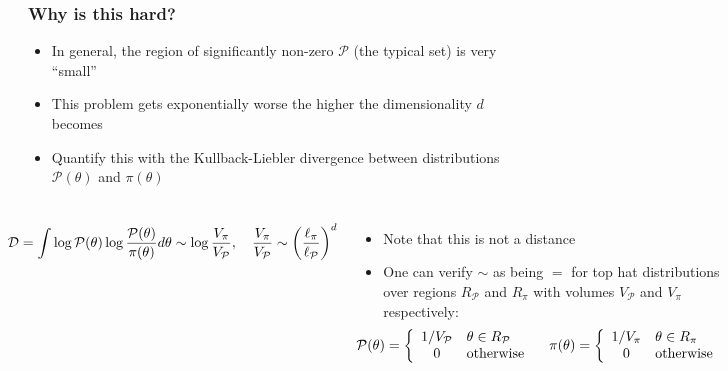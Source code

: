\documentclass[aspectratio=169]{beamer}
\begin{document}
\begin{frame}
    \frametitle{Why is this hard?}
    \begin{itemize}
        \item In general, the region of significantly non-zero $\mathcal{P}$ (the typical set) is very ``small''
        \item This problem gets exponentially worse the higher the dimensionality $d$ becomes

        \item Quantify this with the Kullback-Liebler divergence between distributions $\mathcal{P}(\theta)$ and $\pi(\theta)$
    \end{itemize}
    \begin{columns}[onlytextwidth]
        \vspace{-5pt}
        \[
        \hspace{-15pt}
        \mathcal{D} = \int \log \mathcal{P}(\theta) \log\frac{\mathcal{P}(\theta)}{\pi(\theta)} d\theta \sim \log \frac{V_\pi}{V_\mathcal{P}}, \quad \frac{V_\pi}{V_\mathcal{P}} \sim {\left(\frac{\ell_\mathcal{\pi}}{\ell_\mathcal{P}}\right)}^d \]
        \vspace{-10pt}
        \begin{itemize}
            \item Note that this is \alert{not} a distance
            \item One can verify $\sim$ as being $=$ for top hat distributions over regions $R_\mathcal{P}$  and $R_\mathcal{\pi}$ with volumes $V_\mathcal{P}$ and $V_\mathcal{\pi}$ respectively:
                \[\hspace{-20pt}
                    \mathcal{P}(\theta) = \left\{
                        \begin{array}{cl}
                            1/V_\mathcal{P} & \theta \in R_\mathcal{P}\\
                            0 & \text{otherwise}\\
                        \end{array}
                    \right.
                    \quad
                    \pi(\theta) = \left\{
                        \begin{array}{cl}
                            1/V_\pi & \theta \in R_\pi\\
                            0 & \text{otherwise}\\
                        \end{array}
                    \right.
\]
\end{itemize}
\end{columns}
\end{frame}
\end{document}
